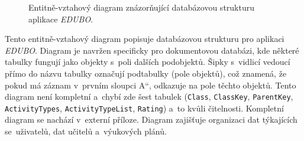 \documentclass[male,czech,api_bc]{kitheses}
\begin{document}
\begin{figure}[H]
	\centering
	\caption{Entitně-vztahový diagram znázorňující databázovou strukturu aplikace \textit{EDUBO}.}
	\label{fig:erd-1}
\end{figure}

Tento entitně-vztahový diagram popisuje databázovou strukturu pro aplikaci \textit{EDUBO}. Diagram je navržen specificky pro dokumentovou databázi, kde některé tabulky fungují jako objekty s~poli dalších podobjektů. Šipky s~vidlicí vedoucí přímo do názvu tabulky označují podtabulky (pole objektů), což znamená, že pokud má záznam v~prvním sloupci \quotedblbase A``, odkazuje na pole těchto objektů. Tento diagram není kompletní a~chybí zde šest tabulek (\texttt{Class}, \texttt{ClassKey}, \texttt{ParentKey}, \texttt{ActivityTypes}, \texttt{ActivityTypeList}, \texttt{Rating}) a~to kvůli čitelnosti. Kompletní diagram se nachází v~externí příloze. Diagram zajišťuje organizaci dat týkajících se~uživatelů, dat učitelů a~výukových plánů.
\end{document}

